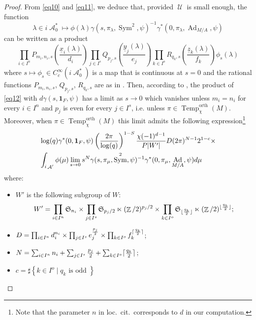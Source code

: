 \documentclass[12pt]{article}
\numberwithin{equation}{section}
\DeclareMathOperator{\orth}{orth}
\DeclareMathOperator{\Temp}{Temp}
\DeclareMathOperator{\Ad}{Ad}
\DeclareMathOperator{\cA}{\mathcal{A}}
\DeclareMathOperator{\bZ}{\mathbb{Z}}
\DeclarePairedDelimiter\ceil{\lceil}{\rceil}
\DeclarePairedDelimiter\floor{\lfloor}{\rfloor}
\DeclareMathOperator{\cU}{\mathcal{U}}
\DeclareMathOperator{\Sym}{Sym}
\begin{document}
\begin{proof}
		From \eqref{eq10} and \eqref{eq11}, we deduce that, provided $\cU$ is small enough, the function
		$$\displaystyle \lambda\in i\cA_0^*\mapsto \phi(\lambda)\gamma(s,\pi_\lambda,\Sym^2,\psi)^{-1}\gamma^*(0,\pi_\lambda,\Ad_{M/A},\psi)$$
		can be written as a product
		$$\displaystyle \prod_{i\in I^n} P_{m_i,n_i,s}(\frac{\underline{x}_i(\lambda)}{d_i})\prod_{j\in I^s} Q_{p_j,s}(\frac{\underline{y}_j(\lambda)}{e_j})\prod_{k\in I^o} R_{q_k,s}(\frac{\underline{z}_k(\lambda)}{f_k})\phi_s(\lambda)$$
		where $s\mapsto \phi_s\in C_c^\infty(i\cA_0^*)$ is a map that is continuous at $s=0$ and the rational functions $P_{m_i,n_i,s}$, $Q_{p_j,s}$, $R_{q_k,s}$ are as in \cite[\S 3.2]{BPPlanch}. Then, according to \cite[Proposition 3.31]{BPPlanch}, the product of \eqref{eq12} with $d\gamma(s,\mathbf{1}_F,\psi)$ has a limit as $s\to 0$ which vanishes unless $m_i=n_i$ for every $i\in I^n$ and $p_j$ is even for every $j\in I^s$, i.e. unless $\pi\in \Temp_\chi^{\orth}(M)$. Moreover, when $\pi\in \Temp_\chi^{\orth}(M)$ this limit admits the following expression\footnote{Note that the parameter $n$ in loc.\ cit.\ corresponds to $d$ in our computation.}
		\begin{align}\label{eq16}
			\displaystyle & \log(q)\gamma^*(0,\mathbf{1}_F,\psi) \left(\frac{2\pi}{\log(q)}\right)^{1-S}\frac{\chi(-1)^{d-1}}{P \lvert W'\rvert} D (2\pi)^{N-1} 2^{1-c} \times \\
			\nonumber & \int_{i\cA'} \phi(\mu) \lim\limits_{s\to 0} s^N\gamma(s,\pi_\mu,\Sym^2,\psi)^{-1} \gamma^*(0,\pi_\mu, \Ad_{M/A},\psi)d\mu
		\end{align}
		where:
		\begin{itemize}
			\item $W'$ is the following subgroup of $W$:
			$$\displaystyle W'=\prod_{i\in I^n} \mathfrak{S}_{n_i}\times \prod_{j\in I^s} \mathfrak{S}_{p_j/2}\ltimes (\bZ/2)^{p_j/2}\times \prod_{k\in I^o} \mathfrak{S}_{\floor{\frac{q_k}{2}}}\ltimes (\bZ/2)^{\floor{\frac{q_k}{2}}};$$
			
			\item $D=\prod_{i\in I^n} d_i^{n_i}\times \prod_{j\in I^s} e_j^{\frac{p_j}{2}}\times \prod_{k\in I^o} f_k^{\ceil{\frac{q_k}{2}}}$;
			
			\item $N=\sum_{i\in I^n} n_i+\sum_{j\in I^s} \frac{p_j}{2}+\sum_{k\in I^o}\ceil{\frac{q_k}{2}}$;
			
			\item $c=\sharp \left\{k\in I^o\mid q_k \mbox{ is odd } \right\}$
			

\end{itemize}
\end{proof}
\end{document}

